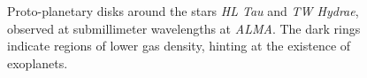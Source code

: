     \\
    \\
    \begin{figure}[h!]
      \centering
      \begin{minipage}{.5\linewidth}
        \centering
      \end{minipage}%
      \begin{minipage}{.5\linewidth}
        \centering
      \end{minipage}
      \caption{Proto-planetary disks around the stars \textit{HL Tau} and 
        \textit{TW Hydrae}, observed at submillimeter wavelengths at
        \textit{ALMA}. The dark rings indicate regions of lower gas density,
        hinting at the existence of exoplanets. 
      }

      \label{fig:proto-planetary_disk}
    \end{figure}

